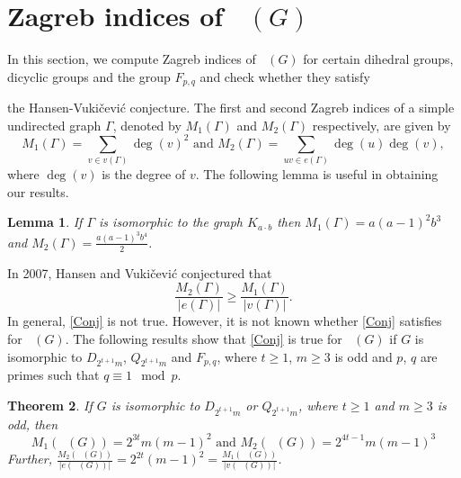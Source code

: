 \documentclass[reqno,12pt]{amsart}
\theoremstyle{plain}
\newtheorem{thm}{Theorem}[section]
\newtheorem{lem}[thm]{Lemma}
\theoremstyle{definition}
\newcommand{\coeng}{\mathop{\mathcal{E}_c^-}}
\begin{document}
\section{Zagreb indices of $\coeng(G)$}
In this section, we compute Zagreb indices of $\coeng(G)$ for certain dihedral groups, dicyclic groups and the group $F_{p, q}$ and check whether they satisfy {the Hansen-Vuki{\v{c}}evi{\'c} conjecture.  The first and second Zagreb indices of a simple undirected graph $\Gamma$, denoted by $M_{1}(\Gamma)$ and $M_{2}(\Gamma)$ respectively, are given by 
\[
M_{1}(\Gamma) = \sum\limits_{v \in v(\Gamma)} \deg(v)^{2}  \text{ and }  M_{2}(\Gamma) = \sum\limits_{uv \in e(\Gamma)} \deg(u)\deg(v),
\]
where $\deg(v)$ is  the  degree of $v$. The following lemma is useful in obtaining our results.
\begin{lem}\label{ZI-lem}
If $\Gamma$ is isomorphic to the graph $K_{a \cdot b}$ then $M_{1}(\Gamma) = a(a - 1)^2b^3 $ and  $M_{2}(\Gamma) = \frac{a(a - 1)^{3}b^{4}}{2} $.
\end{lem}


 In 2007,  Hansen and Vuki{\v{c}}evi{\'c} \cite{hansen2007comparing}  conjectured that
\begin{equation}\label{Conj}
		\dfrac{M_{2}(\Gamma)}{\vert e(\Gamma) \vert} \geq \dfrac{M_{1}(\Gamma)}{\vert v(\Gamma) \vert} .
\end{equation}
In general, \eqref{Conj} is not true. However, it is not known whether \eqref{Conj} satisfies for $\coeng(G)$. The following results show that \eqref{Conj} is  true for $\coeng(G)$ if $G$ is isomorphic to $D_{2^{t+1}m}$,  $Q_{2^{t+1}m}$ and $F_{p, q}$, where $t \geq 1$,  $m \geq 3$ is odd and $p$, $q$ are primes such that $q\equiv 1 \mod p$.
\begin{thm}
If $G$ is isomorphic to   $D_{2^{t+1}m}$ or  $Q_{2^{t+1}m}$, where $t \geq 1$ and $m \geq 3$ is odd, then 
\[
M_1(\coeng(G)) = 2^{3t}m(m - 1)^2 \text{ and } M_2(\coeng(G)) = 2^{4t - 1}m(m - 1)^3
\]
Further, $\frac{M_{2}(\coeng(G))}{\vert e(\coeng(G)) \vert} = 2^{2t}(m - 1)^2 = \frac{M_{1}(\coeng(G))}{\vert v(\coeng(G)) \vert}$.
\end{thm}

}
\end{document}
